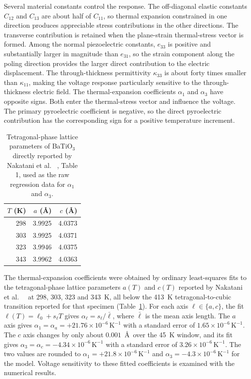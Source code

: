 \documentclass[a4paper,12pt]{elsarticle}
\begin{document}
Several material constants control the response.
The off-diagonal elastic constants $C_{12}$ and $C_{13}$ are about half of $C_{11}$,
so thermal expansion constrained in one direction produces appreciable stress
contributions in the other directions. The transverse contribution is retained when the plane-strain
thermal-stress vector is formed. Among the normal piezoelectric constants, $e_{33}$ is
positive and substantially larger in magnitude than $e_{31}$, so the strain component
along the poling direction provides the larger direct contribution to the electric
displacement. The through-thickness permittivity $\kappa_{33}$ is about forty times
smaller than $\kappa_{11}$, making the voltage response particularly sensitive to the
through-thickness electric field. The thermal-expansion coefficients $\alpha_1$ and $\alpha_3$ have opposite
signs. Both enter the thermal-stress vector and influence the voltage. The
primary pyroelectric coefficient is negative, so the direct pyroelectric contribution
has the corresponding sign for a positive temperature increment.

\begin{table}[t]
\centering
\caption{Tetragonal-phase lattice parameters of BaTiO$_3$ directly reported by
Nakatani et al. ~\cite{Nakatani2016}, Table 1, used as the raw regression data for
$\alpha_1$ and $\alpha_3$.}
\label{tab:nakatani-raw}
\begin{tabular}{@{}rrr@{}}
\toprule
$T$ (K) & $a$ (\AA) & $c$ (\AA) \\
\midrule
298 & 3.9925 & 4.0373 \\
303 & 3.9925 & 4.0371 \\
323 & 3.9946 & 4.0375 \\
343 & 3.9962 & 4.0363 \\
\bottomrule
\end{tabular}
\end{table}

The thermal-expansion coefficients were obtained by ordinary least-squares fits to the
tetragonal-phase lattice parameters $a(T)$ and $c(T)$ reported by Nakatani et al.\
~\cite{Nakatani2016} at 298, 303, 323 and 343~K, all below the 413~K
tetragonal-to-cubic transition reported for that specimen
(Table~\ref{tab:nakatani-raw}). For each axis $\ell\in\{a,c\}$, the fit
$\ell(T)=\ell_0+s_\ell T$ gives $\alpha_\ell=s_\ell/\bar\ell$, where $\bar\ell$ is the
mean axis length. The $a$ axis gives
$\alpha_1=\alpha_a=+21.76\times10^{-6}\,\text{K}^{-1}$ with a standard error of
$1.65\times10^{-6}\,\text{K}^{-1}$. The $c$ axis changes by only about $0.001$~\AA\
over the 45~K window, and its fit gives
$\alpha_3=\alpha_c=-4.34\times10^{-6}\,\text{K}^{-1}$ with a standard error of
$3.26\times10^{-6}\,\text{K}^{-1}$. The two values are rounded to
$\alpha_1=+21.8\times10^{-6}\,\text{K}^{-1}$ and
$\alpha_3=-4.3\times10^{-6}\,\text{K}^{-1}$ for the model. Voltage sensitivity to these fitted coefficients is examined with the numerical results.
\end{document}
